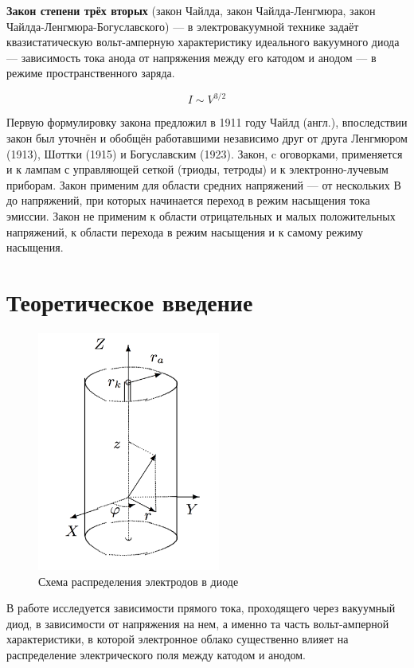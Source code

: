 \documentclass[12pt]{kiarticle} %
\begin{document}
\textbf{Закон степени трёх вторых} (закон Чайлда, закон Чайлда-Ленгмюра, закон Чайлда-Ленгмюра-Богуславского) ---  в электровакуумной технике задаёт квазистатическую вольт-амперную характеристику идеального вакуумного диода --- зависимость тока анода от напряжения между его катодом и анодом --- в режиме пространственного заряда.

\begin{equation}\label{}
I \sim V^{3/2}
\end{equation}

Первую формулировку закона предложил в 1911 году Чайлд (англ.), впоследствии закон был уточнён и обобщён работавшими независимо друг от друга Ленгмюром (1913), Шоттки (1915) и Богуславским (1923). Закон, c оговорками, применяется и к лампам с управляющей сеткой (триоды, тетроды) и к электронно-лучевым приборам. Закон применим для области средних напряжений — от нескольких В до напряжений, при которых начинается переход в режим насыщения тока эмиссии. Закон не применим к области отрицательных и малых положительных напряжений, к области перехода в режим насыщения и к самому режиму насыщения.

\section{Теоретическое введение}
\begin{figure} 
	\includegraphics[width=6cm]{diod}
	\caption{Схема распределения электродов в диоде}
\end{figure}

В работе исследуется зависимости прямого тока, проходящего через вакуумный диод, в зависимости от напряжения на нем, а именно та часть вольт-амперной характеристики, в которой электронное облако существенно влияет на распределение электрического поля между катодом и анодом.
\end{document}

